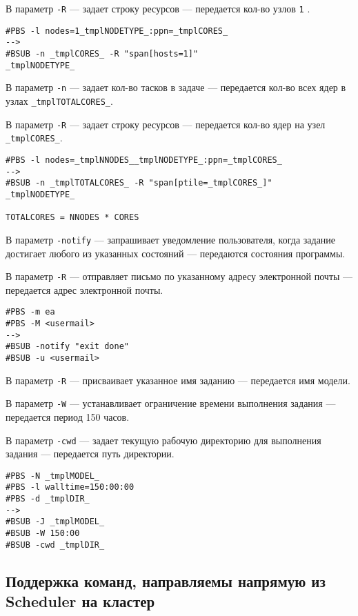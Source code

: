 В параметр \lstinline{-R} --- задает строку ресурсов --- передается кол-во узлов \lstinline{1} \cite{ref_bsub}.
\begin{lstlisting}
#PBS -l nodes=1_tmplNODETYPE_:ppn=_tmplCORES_
-->
#BSUB -n _tmplCORES_ -R "span[hosts=1]"
_tmplNODETYPE_
\end{lstlisting}

В параметр \lstinline{-n} --- задает кол-во тасков в задаче --- передается кол-во всех ядер в узлах \lstinline{_tmplTOTALCORES_}.

В параметр \lstinline{-R} --- задает строку ресурсов --- передается кол-во ядер на узел \lstinline{_tmplCORES_}.
\begin{lstlisting}
#PBS -l nodes=_tmplNNODES__tmplNODETYPE_:ppn=_tmplCORES_
-->
#BSUB -n _tmplTOTALCORES_ -R "span[ptile=_tmplCORES_]"
_tmplNODETYPE_

TOTALCORES = NNODES * CORES
\end{lstlisting}

В параметр \lstinline{-notify} --- запрашивает уведомление пользователя, когда задание достигает любого из указанных состояний --- передаются состояния программы.

В параметр \lstinline{-R} --- отправляет письмо по указанному адресу электронной почты --- передается адрес электронной почты.
\begin{lstlisting}
#PBS -m ea
#PBS -M <usermail>
-->
#BSUB -notify "exit done"
#BSUB -u <usermail>
\end{lstlisting}

В параметр \lstinline{-R} --- присваивает указанное имя заданию --- передается имя модели.

В параметр \lstinline{-W} --- устанавливает ограничение времени выполнения задания --- передается период 150 часов.

В параметр \lstinline{-cwd} --- задает текущую рабочую директорию для выполнения задания --- передается путь директории.
\begin{lstlisting}
#PBS -N _tmplMODEL_
#PBS -l walltime=150:00:00
#PBS -d _tmplDIR_
-->
#BSUB -J _tmplMODEL_
#BSUB -W 150:00
#BSUB -cwd _tmplDIR_
\end{lstlisting}


\subsection{Поддержка команд, направляемы напрямую из Scheduler на кластер}

